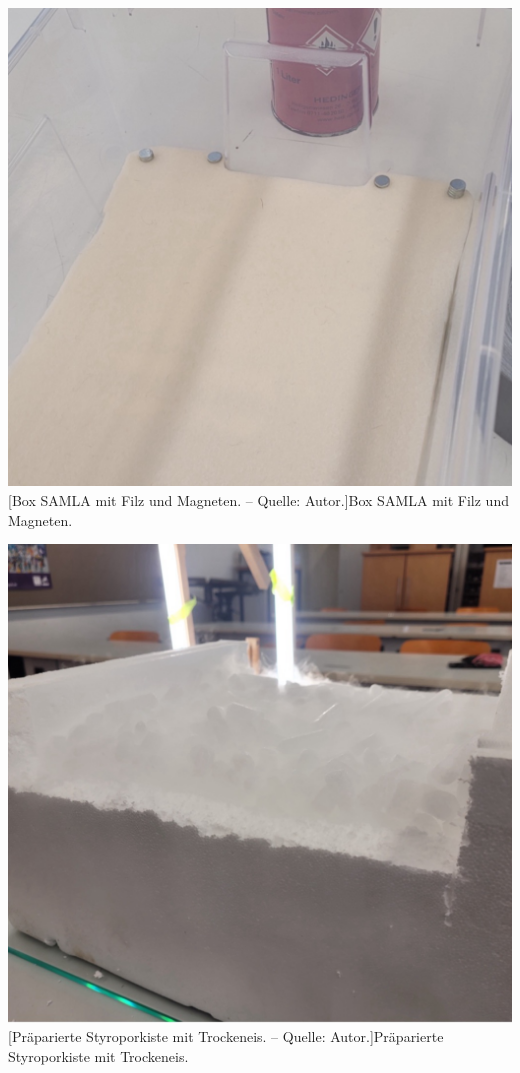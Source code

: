 \documentclass[a4paper,12pt]{article}
\begin{document}
	\begin{minipage}[t]{.48\textwidth}
		\includegraphics[width=\textwidth]{Abbildung8_scaled}
		[Box SAMLA mit Filz und Magneten. -- Quelle: Autor.]{Box SAMLA mit Filz und Magneten.}
		\label{fig:samla}
	\end{minipage} \hfill
	\begin{minipage}[t]{.48\textwidth}
		\includegraphics[width=\textwidth]{Abbildung9_scaled}
		[Präparierte Styroporkiste mit Trockeneis. -- Quelle: Autor.]{Präparierte Styroporkiste mit Trockeneis.}
		\label{fig:trockeneis}	
	\end{minipage} \\
	
\end{document}
